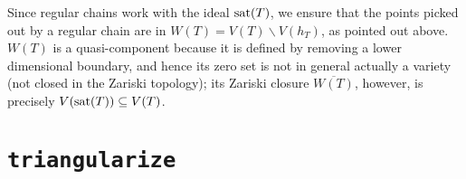 Since regular chains work with the ideal $\mbox{{\rm sat}$(T)$}$, we ensure that the points picked out by a regular chain are in $W(T)=V(T)\backslash V(h_T)$, as pointed out above. $W(T)$ is a quasi-component because it is defined by removing a lower dimensional boundary, and hence its zero set is not in general actually a variety (not closed in the Zariski topology); its Zariski closure $\overline{W(T)}$, however, is precisely $V(\mbox{{\rm sat}$(T)$})\subseteq V(T)$.


\section{ \texttt{triangularize}}

